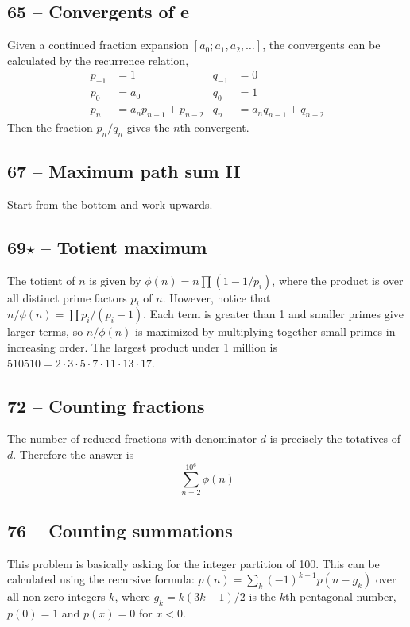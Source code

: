 \documentclass{article}
\begin{document}
\subsection*{65 -- Convergents of e} 
Given a continued fraction expansion $[a_0; a_1, a_2, \dotsc]$, the convergents can be calculated by the recurrence relation,
\begin{align*}
p_{-1} &= 1 & q_{-1} &= 0 \\ 
p_0 &= a_0 & q_0 &= 1 \\ 
p_n &= a_n p_{n-1} + p_{n-2} & q_n &= a_n q_{n-1} + q_{n-2} 
\end{align*}
Then the fraction $p_n/q_n$ gives the $n$th convergent.

\subsection*{67 -- Maximum path sum II} 
Start from the bottom and work upwards.

\subsection*{69$\star$ -- Totient maximum} 
The totient of $n$ is given by $\phi(n) =n \prod (1-1/p_i)$, where the product is over all distinct prime factors $p_i$ of $n$. 
However, notice that $n/\phi(n) = \prod p_i/(p_i -1)$. 
Each term is greater than 1 and smaller primes give larger terms, so $n/\phi(n)$ is maximized by multiplying together small primes in increasing order. The largest product under 1 million is $\boxed{510510} = 2 \cdot 3\cdot5\cdot7\cdot11\cdot13\cdot17$.

\subsection*{72 -- Counting fractions} 
The number of reduced fractions with denominator $d$ is precisely the totatives of $d$. 
Therefore the answer is $$\sum\limits_{n=2}^{10^6} \phi(n)$$

\subsection*{76 -- Counting summations} 
This problem is basically asking for the integer partition of 100. 
This can be calculated using the recursive formula: $p(n) = \sum_k (-1)^{k-1} p(n - g_k)$ over all non-zero integers $k$, where $g_k = k(3k - 1)/2$ is the $k$th pentagonal number, $p(0) = 1$ and $p(x) = 0$ for $x < 0$.
\end{document}
